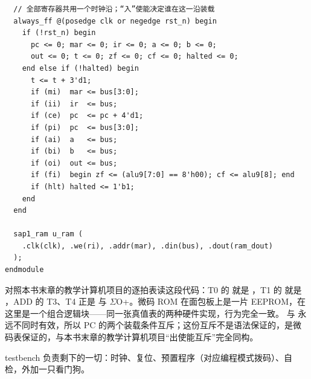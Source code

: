 \begin{lstlisting}
  // 全部寄存器共用一个时钟沿；“入”使能决定谁在这一沿装载
  always_ff @(posedge clk or negedge rst_n) begin
    if (!rst_n) begin
      pc <= 0; mar <= 0; ir <= 0; a <= 0; b <= 0;
      out <= 0; t <= 0; zf <= 0; cf <= 0; halted <= 0;
    end else if (!halted) begin
      t <= t + 3'd1;
      if (mi)  mar <= bus[3:0];
      if (ii)  ir  <= bus;
      if (ce)  pc  <= pc + 4'd1;
      if (pi)  pc  <= bus[3:0];
      if (ai)  a   <= bus;
      if (bi)  b   <= bus;
      if (oi)  out <= bus;
      if (fi)  begin zf <= (alu9[7:0] == 8'h00); cf <= alu9[8]; end
      if (hlt) halted <= 1'b1;
    end
  end

  sap1_ram u_ram (
    .clk(clk), .we(ri), .addr(mar), .din(bus), .dout(ram_dout)
  );
endmodule
\end{lstlisting}

对照本书末章的教学计算机项目的逐拍表读这段代码：T0 的  就是 ，T1 的  就是 ，ADD 的 T3、T4 正是  与 $\Sigma$O+。微码 ROM 在面包板上是一片 EEPROM，在这里是一个组合逻辑块——同一张真值表的两种硬件实现，行为完全一致。 与  永远不同时有效，所以 PC 的两个装载条件互斥；这份互斥不是语法保证的，是微码表保证的，与本书末章的教学计算机项目“出使能互斥”完全同构。

testbench 负责剩下的一切：时钟、复位、预置程序（对应编程模式拨码）、自检，外加一只看门狗。

